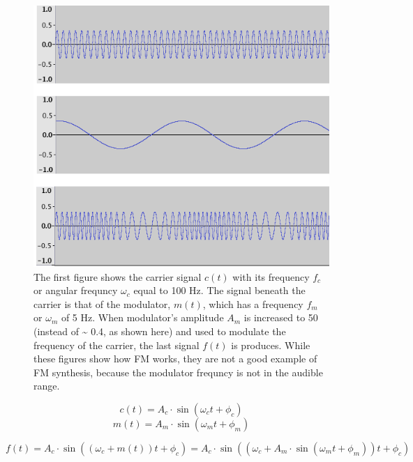\begin{figure}[]
  \includegraphics[scale=0.7]{img/fmlow}
  \caption{The first figure shows the carrier signal $c(t)$ with its frequency $f_{c}$ or angular frequncy $\omega_{c}$ equal to 100 Hz. The signal beneath the carrier is that of the modulator, $m(t)$, which has a frequency $f_{m}$ or $\omega_{m}$ of 5 Hz. When modulator's amplitude $A_{m}$ is increased to 50 (instead of \textasciitilde{} 0.4, as shown here) and used to modulate the frequency of the carrier, the last signal $f(t)$ is produces. While these figures show how FM works, they are not a good example of FM synthesis, because the modulator frequncy is not in the audible range.}
  \label{fig:fmlow}
\end{figure}

\begin{multicols}{2}
  \begin{equation}
    c(t) = A_{c} \cdot \sin(\omega_{c}t + \phi_{c})
    \end{equation}\break
    \begin{equation}
      m(t) = A_{m} \cdot \sin(\omega_{m}t + \phi_{m})
    \end{equation}
  \end{multicols}

  \begin{equation}
    f(t) = A_{c} \cdot \sin((\omega_{c} + m(t))t + \phi_{c}) = A_{c} \cdot \sin((\omega_{c} + A_{m} \cdot \sin(\omega_{m}t + \phi_{m}))t + \phi_{c})
    \label{eq:fm}
  \end{equation}

